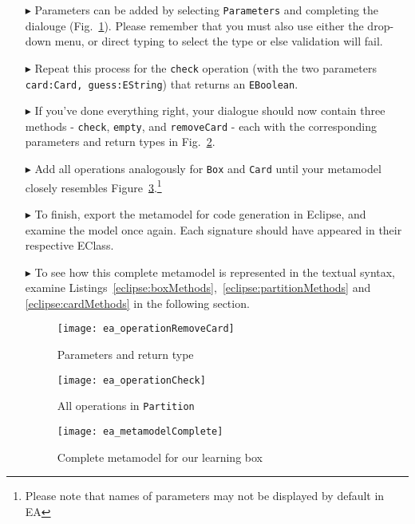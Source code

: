 \begin{enumerate}
\item[$\blacktriangleright$] Parameters can be added by selecting \texttt{Parameters} and
completing the dialouge (Fig.~\ref{ea:operation_parameters}). Please remember that you must also use either the drop-down menu, or direct typing to select the type or else validation
will fail.

\item[$\blacktriangleright$] Repeat this process for the \texttt{check} operation (with the two parameters \texttt{card:Card, guess:EString}) that returns an \texttt{EBoolean}. 

\item[$\blacktriangleright$] If you've done everything right, your dialogue should now contain three methods - \texttt{check}, \texttt{empty}, and
\texttt{removeCard} - each with the corresponding parameters and return types in Fig.~\ref{ea:operation_partition}.


\item[$\blacktriangleright$] Add all operations analogously for \texttt{Box} and \texttt{Card} until your metamodel closely resembles
Figure~\ref{ea:metamodel_complete}.\footnote{Please note that names of parameters may not be displayed by default in EA}

\item[$\blacktriangleright$] To finish, export the metamodel for code generation in Eclipse, and examine the model once again. Each signature should have
appeared in their respective EClass.

\item[$\blacktriangleright$] To see how this complete metamodel is represented in the textual syntax, examine Listings~\ref{eclipse:boxMethods},~\ref{eclipse:partitionMethods} and~ \ref{eclipse:cardMethods} in the
following section. 

\newpage

\vspace*{1cm}

\begin{figure}[htbp]
	\centering
  \texttt{[image: ea\_operationRemoveCard]}
	\caption{Parameters and return type}
	\label{ea:operation_parameters}
\end{figure}

\vspace{1cm}

\begin{figure}[h!]
	\centering
  \texttt{[image: ea\_operationCheck]}
	\caption{All operations in \texttt{Partition}}
	\label{ea:operation_partition}
\end{figure}

\newpage


\begin{figure}[htbp]
	\centering
  \texttt{[image: ea\_metamodelComplete]}
\caption[Complete metamodel for our learning box.]{Complete metamodel for our learning box}
	\label{ea:metamodel_complete}
\end{figure}
\FloatBarrier


\end{enumerate}

